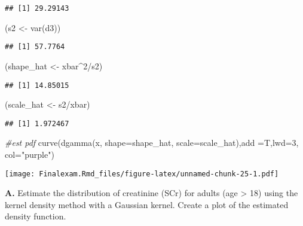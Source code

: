 \documentclass[
]{article}
\newenvironment{Shaded}{\begin{snugshade}}{\end{snugshade}}
\newcommand{\AttributeTok}[1]{\textcolor[rgb]{0.77,0.63,0.00}{#1}}
\newcommand{\CommentTok}[1]{\textcolor[rgb]{0.56,0.35,0.01}{\textit{#1}}}
\newcommand{\DecValTok}[1]{\textcolor[rgb]{0.00,0.00,0.81}{#1}}
\newcommand{\FunctionTok}[1]{\textcolor[rgb]{0.00,0.00,0.00}{#1}}
\newcommand{\NormalTok}[1]{#1}
\newcommand{\OtherTok}[1]{\textcolor[rgb]{0.56,0.35,0.01}{#1}}
\newcommand{\SpecialCharTok}[1]{\textcolor[rgb]{0.00,0.00,0.00}{#1}}
\newcommand{\StringTok}[1]{\textcolor[rgb]{0.31,0.60,0.02}{#1}}
\begin{document}
\begin{verbatim}
## [1] 29.29143
\end{verbatim}

\begin{Shaded}
\begin{Highlighting}[]
\NormalTok{(s2 }\OtherTok{\textless{}{-}} \FunctionTok{var}\NormalTok{(d3))}
\end{Highlighting}
\end{Shaded}

\begin{verbatim}
## [1] 57.7764
\end{verbatim}

\begin{Shaded}
\begin{Highlighting}[]
\NormalTok{(shape\_hat }\OtherTok{\textless{}{-}}\NormalTok{ xbar}\SpecialCharTok{\^{}}\DecValTok{2}\SpecialCharTok{/}\NormalTok{s2)}
\end{Highlighting}
\end{Shaded}

\begin{verbatim}
## [1] 14.85015
\end{verbatim}

\begin{Shaded}
\begin{Highlighting}[]
\NormalTok{(scale\_hat }\OtherTok{\textless{}{-}}\NormalTok{ s2}\SpecialCharTok{/}\NormalTok{xbar)}
\end{Highlighting}
\end{Shaded}

\begin{verbatim}
## [1] 1.972467
\end{verbatim}

\begin{Shaded}
\begin{Highlighting}[]
\CommentTok{\#est pdf}
\FunctionTok{curve}\NormalTok{(}\FunctionTok{dgamma}\NormalTok{(x, }\AttributeTok{shape=}\NormalTok{shape\_hat, }\AttributeTok{scale=}\NormalTok{scale\_hat),}\AttributeTok{add =}\NormalTok{T,}\AttributeTok{lwd=}\DecValTok{3}\NormalTok{, }\AttributeTok{col=}\StringTok{"purple"}\NormalTok{)}
\end{Highlighting}
\end{Shaded}

\texttt{[image: Finalexam.Rmd\_files/figure-latex/unnamed-chunk-25-1.pdf]}

\textbf{A.} Estimate the distribution of creatinine (SCr) for adults
(age \textgreater{} 18) using the kernel density method with a Gaussian
kernel. Create a plot of the estimated density function.
\end{document}
